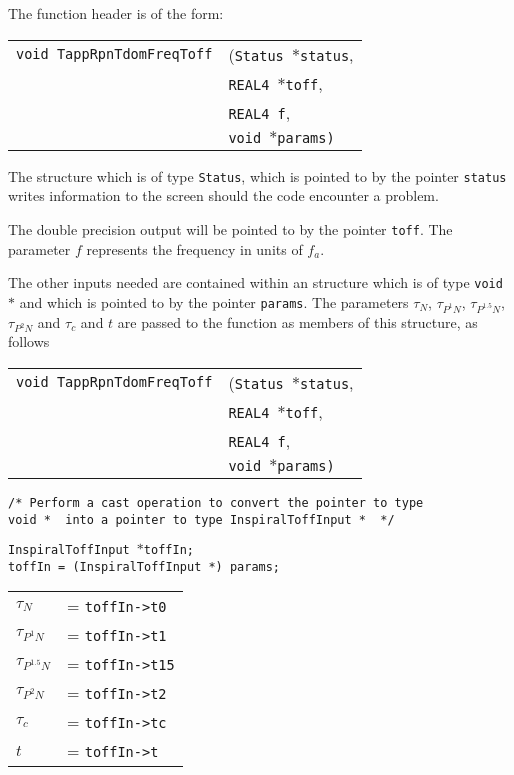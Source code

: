 \documentclass[12pt]{article}
\begin{document}
The function header is of the form:

\vspace{5mm}

\begin{tabular}{ll}
\texttt{void TappRpnTdomFreqToff} & (\texttt{Status $\ast$status}, \\
                        & \texttt{REAL4 $\ast$toff}, \\
			& \texttt{REAL4 f}, \\
                        & \texttt{void $\ast$params)} 
\end{tabular}

\vspace{5mm}

The structure which is of type \texttt{Status}, which is pointed to by the pointer \texttt{status} writes information to the screen should the code encounter a problem. 

The double precision output will be pointed to by the pointer \texttt{toff}. The parameter $f$ represents the frequency in units of $f_{a}$.

The other inputs needed are contained within an structure which is of type \texttt{void $\ast$} and which is pointed to by the pointer \texttt{params}.
The parameters $\tau_{N}$, $\tau_{P^{1}N}$, $\tau_{P^{1.5}N}$, $\tau_{P^{2}N}$ and $\tau_{c}$ and $t$ are passed to the function as members of this structure, as follows

\vspace{5mm}

\begin{tabular}{ll}
\texttt{void TappRpnTdomFreqToff} & (\texttt{Status $\ast$status}, \\
                        & \texttt{REAL4 $\ast$toff}, \\
			& \texttt{REAL4 f}, \\
                        & \texttt{void $\ast$params)} 
\end{tabular}

\begin{verbatim}
/* Perform a cast operation to convert the pointer to type
void *  into a pointer to type InspiralToffInput *  */
\end{verbatim}
\texttt{InspiralToffInput $\ast$toffIn;} \\
\texttt{toffIn = (InspiralToffInput *) params;}

\begin{tabular}{ll}
$\tau_{N}$        &= \texttt{toffIn->t0}  \\
$\tau_{P^{1}N}$   &= \texttt{toffIn->t1}  \\
$\tau_{P^{1.5}N}$ &= \texttt{toffIn->t15}  \\
$\tau_{P^{2}N}$   &= \texttt{toffIn->t2}  \\
$\tau_{c}$        &= \texttt{toffIn->tc}  \\
$t$               &= \texttt{toffIn->t}  \\
\end{tabular}
\end{document}
